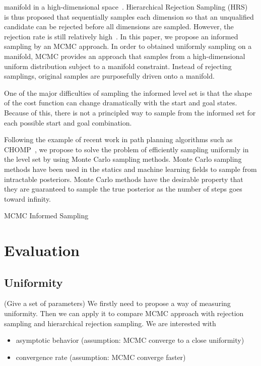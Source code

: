 \documentclass[letterpaper, 10 pt, conference]{ieeeconf}  %
\begin{document}
{ manifold in a high-dimensional space~\cite{KTC16}.
Hierarchical Rejection Sampling (HRS)~\cite{KTC16} is thus proposed that sequentially samples each dimension so that an unqualified candidate can be rejected before all dimensions are sampled. 
However, the rejection rate is still relatively high~\cite{KTC16}.
In this paper, we propose an informed sampling by an MCMC approach.
In order to obtained uniformly sampling on a manifold, MCMC provides an approach that samples from a high-dimensional uniform distribution subject to a manifold constraint.
Instead of rejecting samplings, original samples are purposefully driven onto a manifold.

One of the major difficulties of sampling the informed level set is that the shape of the cost function can change dramatically with the start and goal states. Because of this, there is not a principled way to sample from the informed set for each possible start and goal combination.  

Following the example of recent work in path planning algorithms such as CHOMP~\cite{RZBS09}, we propose to solve the problem of efficiently sampling uniformly in the level set by using Monte Carlo sampling methods. Monte Carlo sampling methods have been used in the statics and machine learning fields to sample from intractable posteriors. Monte Carlo methods have the desirable property that they are guaranteed to sample the true posterior as the number of steps goes toward infinity.


\begin{algorithm}
	\begin{algorithmic}[1]
		\STATE
   	\end{algorithmic}
	\caption{MCMC Informed Sampling}
	\label{alg:mcmc_informed_sampling}
\end{algorithm}
}

\section{Evaluation}
\label{sec:eval}

\subsection{Uniformity}

(Give a set of parameters)
We firstly need to propose a way of measuring uniformity.
Then we can apply it to compare MCMC approach with rejection sampling and hierarchical rejection sampling.
We are interested with
\begin{itemize}
	\item asymptotic behavior (assumption: MCMC converge to a close uniformity)
	\item convergence rate (assumption: MCMC converge faster)
\end{itemize}
\end{document}
